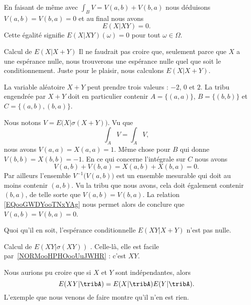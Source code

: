 \begin{subproof}
        En faisant de même avec \( \int_BV=V(a,b)+V(b,a)\) nous déduisons \( V(a,b)=V(b,a)=0\) et au final nous avons
        \begin{equation}
            E(X|XY)=0.
        \end{equation}
        Cette égalité signifie \( E(X|XY)(\omega)=0\) pour tout \( \omega\in \Omega\).

    \item[Calcul de \( E(X|X+Y)\)] Il ne faudrait pas croire que, seulement parce que \( X\) a une espérance nulle, nous trouverons une espérance nulle quel que soit le conditionnement. Juste pour le plaisir, nous calculons \( E(X|X+Y)\).

        La variable aléatoire \( X+Y\) peut prendre trois valeurs : \( -2\), \( 0\) et \( 2\). La tribu engendrée par \( X+Y\) doit en particulier contenir \( A=\{ (a,a) \}\), \( B=\{ (b,b) \}\) et \( C=\{ (a,b),(b,a) \}\).

        Nous notons \( V=E\big( X|\sigma(X+Y) \big)\). Vu que
        \begin{equation}
            \int_AV=\int_AV,
        \end{equation}
        nous avons \( V(a,a)=X(a,a)=1\). Même chose pour \( B\) qui donne \( V(b,b)=X(b,b)=-1\). En ce qui concerne l'intégrale sur \( C\) nous avons
        \begin{equation}        \label{EQooGWDYooTNxYAg}
            V(a,b)+V(b,a)=X(a,b)+X(b,a)=0.
        \end{equation}
        Par ailleurs l'ensemble \( V^{-1}\big( V(a,b) \big)\) est un ensemble mesurable qui doit au moins contenir \( (a,b)\). Vu la tribu que nous avons, cela doit également contenir \( (b,a)\), de telle sorte que \( V(a,b)=V(b,a)\). La relation \eqref{EQooGWDYooTNxYAg} nous permet alors de conclure que \( V(a,b)=V(b,a)=0\).

        Quoi qu'il en soit, l'espérance conditionnelle \( E(XY|X+Y)\) n'est pas nulle.

    \item[Calcul de \( E(XY|\sigma(XY))\)]. Celle-là, elle est facile par~\ref{NORMooHPHOooUuJWHR} : c'est \( XY\).

\end{subproof}

Nous aurions pu croire que si \( X\) et \( Y\) sont indépendantes, alors
\begin{equation}        \label{EQooHSVCooAcgRhw}
    E(XY|\tribA)=E(X|\tribA)E(Y|\tribA).
\end{equation}
L'exemple que nous venons de faire montre qu'il n'en est rien.

